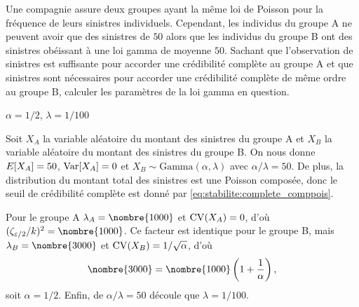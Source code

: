 \begin{exercice}
  Une compagnie assure deux groupes ayant la même loi de Poisson pour
  la fréquence de leurs sinistres individuels. Cependant, les
  individus du groupe A ne peuvent avoir que des sinistres de $50$
  alors que les individus du groupe B ont des sinistres obéissant à
  une loi gamma de moyenne $50$. Sachant que l'observation de
   sinistres est suffisante pour accorder une crédibilité
  complète au groupe A et que  sinistres sont nécessaires
  pour accorder une crédibilité complète de même ordre au groupe B,
  calculer les paramètres de la loi gamma en question.
  \begin{rep}
    $\alpha = 1/2$, $\lambda = 1/100$
  \end{rep}
  \begin{sol}
    Soit $X_A$ la variable aléatoire du montant des sinistres du
    groupe A et $X_B$ la variable aléatoire du montant des sinistres
    du groupe B. On nous donne $E [ X_A ] = 50$, $\operatorname{Var} [ X_A ] = 0$ et
    $X_B \sim \text{Gamma}(\alpha, \lambda)$ avec
    $\alpha/\lambda = 50$. De plus, la distribution du montant total
    des sinistres est une Poisson composée, donc le seuil de
    crédibilité complète est donné par \eqref{eq:stabilite:complete_comppois}.

    Pour le groupe A $\lambda_A = \nombre{1000}$ et $\operatorname{CV}(X_A) = 0$,
    d'où $(\zeta_{\varepsilon/2}/k)^2 = \nombre{1000}$. Ce facteur est
    identique pour le groupe B, mais $\lambda_B = \nombre{3000}$ et
    $\operatorname{CV}(X_B) = 1/\sqrt{\alpha}$, d'où
    \begin{displaymath}
      \nombre{3000} = \nombre{1000}
      \left(
        1 + \frac{1}{\alpha}
      \right),
    \end{displaymath}
    soit $\alpha = 1/2$. Enfin, de $\alpha/\lambda = 50$ découle que
    $\lambda = 1/100$.
  \end{sol}
\end{exercice}

